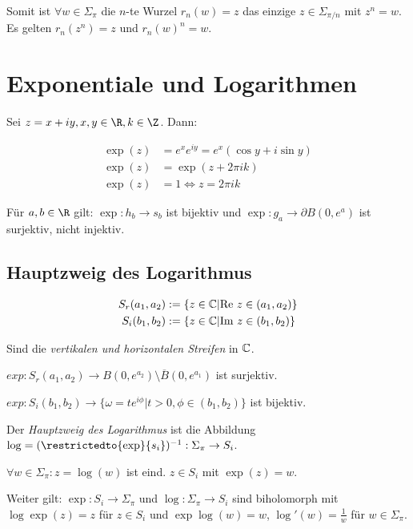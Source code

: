 Somit ist $\forall w \in \Sigma_\pi$ die $n$-te Wurzel $r_n(w) = z$ das einzige $z \in \Sigma_{\pi/n}$ mit $z^n = w$. Es gelten $r_n(z^n) = z$ und $r_n(w)^n = w$.

\section*{Exponentiale und Logarithmen}

Sei $z = x + iy, x, y \in \R, k \in \Z$. Dann:

\vspace*{-4mm}
\begin{align*}
	\exp(z) &= e^x e^{iy} = e^x(\cos y + i \sin y) \\
	\exp(z) &= \exp(z+2\pi ik) \\
	\exp(z) &= 1 \iff z=2\pi i k
\end{align*}

Für $a, b \in \R$ gilt: $\exp : h_b \to s_b$ ist bijektiv und $\exp : g_a \to \partial B(0,e^a)$ ist surjektiv, nicht injektiv.

\subsection*{Hauptzweig des Logarithmus}

\vspace*{-4mm}
\begin{align*}
	S_r(a_1,a_2) &:= \{ z \in \mathbb{C} | \text{Re } z \in (a_1,a_2) \} \\
	S_i(b_1,b_2) &:= \{ z \in \mathbb{C} | \text{Im } z \in (b_1,b_2) \}
\end{align*}
\vspace*{-6mm}

Sind die \emph{vertikalen und horizontalen Streifen} in $\mathbb{C}$.

\spacing

$exp : S_r(a_1,a_2) \to B(0,e^{a_2}) \setminus \overline B(0,e^{a_1})$ ist surjektiv.

$exp : S_i(b_1,b_2) \to \{ \omega = te^{i\phi} | t > 0, \phi \in (b_1,b_2) \}$ ist bijektiv.

\spacing

Der \emph{Hauptzweig des Logarithmus} ist die Abbildung $\log = (\restrictedto{\exp}{s_i})^{-1} : \Sigma_\pi \to S_i$.

$\forall w \in \Sigma_\pi : z = \log(w)$ ist eind. $z \in S_i$ mit $\exp(z) = w$.

Weiter gilt: $\exp : S_i \to \Sigma_\pi$ und $\log : \Sigma_\pi \to S_i$ sind biholomorph mit $\log\exp(z) = z$ für $z \in S_i$ und $\exp\log(w) = w$, $\log'(w) = \frac{1}{w}$ für $w \in \Sigma_\pi$.

